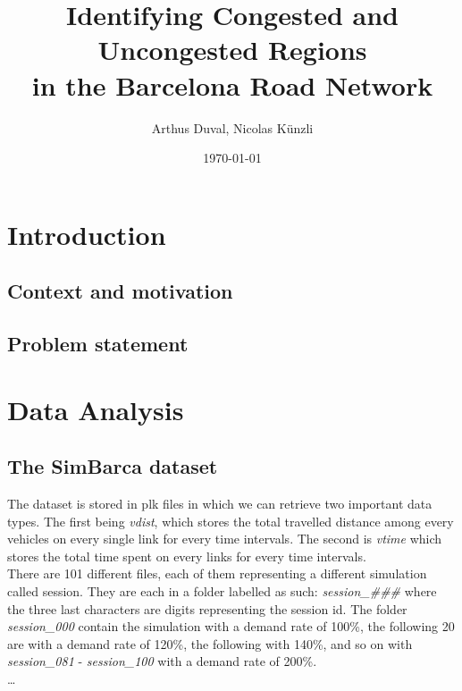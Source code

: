 \documentclass[11pt,a4paper]{article}
\title{Identifying Congested and Uncongested Regions \\
       in the Barcelona Road Network}
\author{Arthus Duval, Nicolas Künzli}
\date{\today}
\begin{document}
\maketitle
\begin{abstract}
\end{abstract}
\tableofcontents
\newpage

\section{Introduction}
\label{sec:intro}

\subsection{Context and motivation}

\subsection{Problem statement}




\section{Data Analysis}
\label{sec:data}

\subsection{The SimBarca dataset}
\label{sec:data:dataset}
The dataset is stored in plk files in which we can retrieve two important data types. The first being \textit{vdist}, which stores the total travelled distance among every vehicles on every single link for every time intervals. The second is \textit{vtime} which stores the total time spent on every links for every time intervals.\\
There are 101 different files, each of them representing a different simulation called session. They are each in a folder labelled as such: \textit{session\_\#\#\#} where the three last characters are digits representing the session id. The folder \textit{session\_000} contain the simulation with a demand rate of 100\%, the following 20 are with a demand rate of 120\%, the following with 140\%, and so on with \textit{session\_081} - \textit{session\_100} with a demand rate of 200\%.\\
\dots
\end{document}
